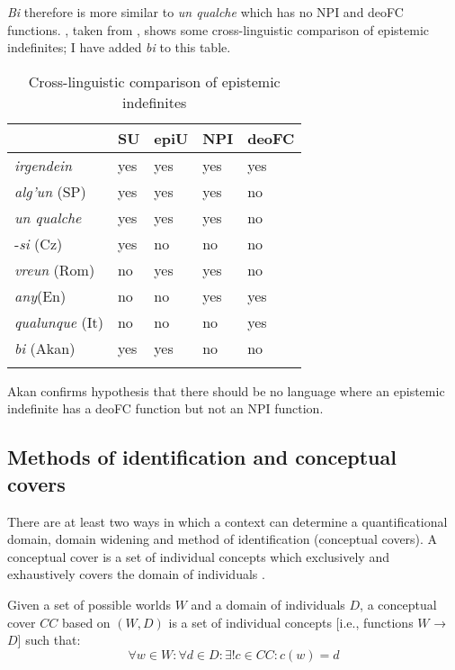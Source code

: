\documentclass[output=paper,modfonts,nonflat,draftmode]{langsci/langscibook}
\begin{document}
\emph{Bi} therefore is more similar to \emph{un qualche} which has no NPI and deoFC functions. , taken from \citet{AloniPort2015}, shows some cross-linguistic comparison of epistemic indefinites; I have added \emph{bi} to this table.

\begin{table}
\caption{Cross-linguistic comparison of epistemic indefinites}
	\begin{tabularx}{.8\textwidth}{lXXXX}
		\lsptoprule
		{}		& SU		& 	epiU & NPI & deoFC \\ 
		\midrule 
		\emph{irgendein} 			& yes 		& 	yes	& 	yes	& 	yes	\\ 
		\emph{alg'un} (SP)        & yes 	 	& 	yes 	& 	yes & 	no		\\ 
		 \emph{un qualche} 		& yes 	 	& 	yes 	& 	yes & 	no \\		
		-\emph{si} (Cz)	& 	yes	& 	no &	 no & no			\\ 
		\emph{vreun} (Rom) 		& no	 	& 	yes 	& 	yes & 	no \\			
		\emph{any}(En) 		& no 	 	& 	no 	& 	yes & 	yes \\			
		\emph{qualunque} (It)		& no	 	& 	no 	& 	no & 	yes \\		
		\emph{bi} (Akan) 		& yes 	 	& 	yes 	& 	no & 	no \\		
		\lspbottomrule
	\end{tabularx}
	\label{tab:owusu:1}
    \end{table}
    
Akan confirms  hypothesis that there should be no language where an epistemic indefinite has a deoFC function but not an NPI function. 

\subsection{Methods of identification and conceptual covers}
There are at least two ways in which a context can determine a quantificational domain, domain widening and method of identification (conceptual covers). 
A conceptual cover is a set of individual concepts which exclusively and exhaustively covers the domain of individuals \citep{Aloni2001}.

\ea{} Given a set of possible worlds $W$ and a domain of individuals $D$, a conceptual cover $CC$ based on $(W, D)$ is a set of individual concepts [i.e., functions $W$ → $D$] such that: 
\[ \forall w \in W: \forall d \in D: \exists!c \in CC : c(w)=d \]
\z
\end{document}
